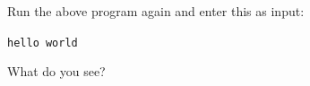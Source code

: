 Run the above program again and enter this as input:



\begin{center}

\texttt{hello world}

\end{center}



What do you see?

